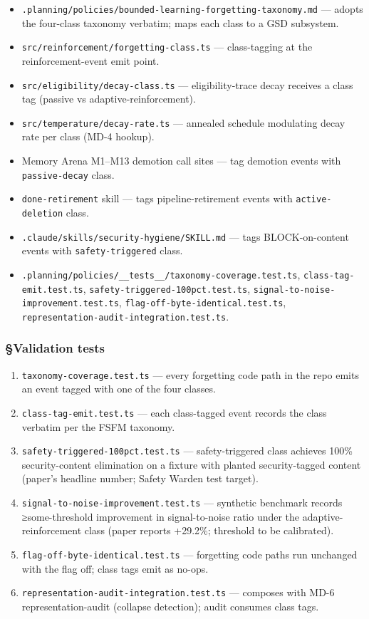 \documentclass[11pt,letterpaper]{article}
\providecommand{\tightlist}{\setlength{\itemsep}{0pt}\setlength{\parskip}{0pt}}
\begin{document}
\begin{itemize}
\tightlist
\item
  \texttt{.planning/policies/bounded-learning-forgetting-taxonomy.md}
  --- adopts the four-class taxonomy verbatim; maps each class to a GSD
  subsystem.
\item
  \texttt{src/reinforcement/forgetting-class.ts} --- class-tagging at
  the reinforcement-event emit point.
\item
  \texttt{src/eligibility/decay-class.ts} --- eligibility-trace decay
  receives a class tag (passive vs adaptive-reinforcement).
\item
  \texttt{src/temperature/decay-rate.ts} --- annealed schedule
  modulating decay rate per class (MD-4 hookup).
\item
  Memory Arena M1--M13 demotion call sites --- tag demotion events with
  \texttt{passive-decay} class.
\item
  \texttt{done-retirement} skill --- tags pipeline-retirement events
  with \texttt{active-deletion} class.
\item
  \texttt{.claude/skills/security-hygiene/SKILL.md} --- tags
  BLOCK-on-content events with \texttt{safety-triggered} class.
\item
  \texttt{.planning/policies/\_\_tests\_\_/taxonomy-coverage.test.ts},
  \texttt{class-tag-emit.test.ts},
  \texttt{safety-triggered-100pct.test.ts},
  \texttt{signal-to-noise-improvement.test.ts},
  \texttt{flag-off-byte-identical.test.ts},
  \texttt{representation-audit-integration.test.ts}.
\end{itemize}

\subsubsection{§Validation tests}

\begin{enumerate}
\def\labelenumi{\arabic{enumi}.}
\tightlist
\item
  \texttt{taxonomy-coverage.test.ts} --- every forgetting code path in
  the repo emits an event tagged with one of the four classes.
\item
  \texttt{class-tag-emit.test.ts} --- each class-tagged event records
  the class verbatim per the FSFM taxonomy.
\item
  \texttt{safety-triggered-100pct.test.ts} --- safety-triggered class
  achieves 100\% security-content elimination on a fixture with planted
  security-tagged content (paper's headline number; Safety Warden test
  target).
\item
  \texttt{signal-to-noise-improvement.test.ts} --- synthetic benchmark
  records ≥some-threshold improvement in signal-to-noise ratio under the
  adaptive-reinforcement class (paper reports +29.2\%; threshold to be
  calibrated).
\item
  \texttt{flag-off-byte-identical.test.ts} --- forgetting code paths run
  unchanged with the flag off; class tags emit as no-ops.
\item
  \texttt{representation-audit-integration.test.ts} --- composes with
  MD-6 representation-audit (collapse detection); audit consumes class
  tags.
\end{enumerate}
\end{document}
